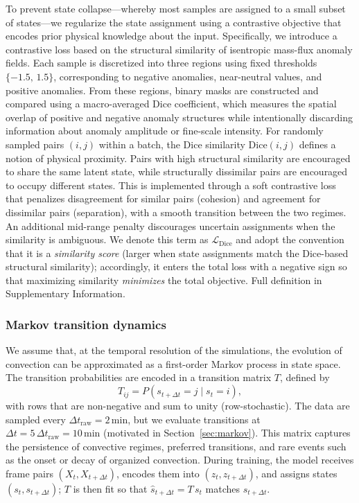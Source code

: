 \documentclass[11pt]{article}
\begin{document}
To prevent state collapse—whereby most samples are assigned to a small subset of states—we regularize the state assignment using a contrastive objective that encodes prior physical knowledge about the input. Specifically, we introduce a contrastive loss based on the structural similarity of isentropic mass-flux anomaly fields. Each sample is discretized into three regions using fixed thresholds $\{-1.5,\,1.5\}$, corresponding to negative anomalies, near-neutral values, and positive anomalies. From these regions, binary masks are constructed and compared using a macro-averaged Dice coefficient, which measures the spatial overlap of positive and negative anomaly structures while intentionally discarding information about anomaly amplitude or fine-scale intensity. For randomly sampled pairs $(i,j)$ within a batch, the Dice similarity $\mathrm{Dice}(i,j)$ defines a notion of physical proximity. Pairs with high structural similarity are encouraged to share the same latent state, while structurally dissimilar pairs are encouraged to occupy different states. This is implemented through a soft contrastive loss that penalizes disagreement for similar pairs (cohesion) and agreement for dissimilar pairs (separation), with a smooth transition between the two regimes. An additional mid-range penalty discourages uncertain assignments when the similarity is ambiguous. We denote this term as $\mathcal{L}_{\mathrm{Dice}}$ and adopt the convention that it is a \emph{similarity score} (larger when state assignments match the Dice-based structural similarity); accordingly, it enters the total loss with a negative sign so that maximizing similarity \emph{minimizes} the total objective. Full definition in Supplementary Information.

\subsubsection{Markov transition dynamics}

We assume that, at the temporal resolution of the simulations, the evolution of convection can be approximated as a first-order Markov process in state space. The transition probabilities are encoded in a transition matrix $T$, defined by
\[
T_{ij} = P(s_{t+\Delta t} = j \mid s_t = i),
\]
with rows that are non-negative and sum to unity (row-stochastic). The data are sampled every $\Delta t_\text{raw}=2\,\mathrm{min}$, but we evaluate transitions at $\Delta t = 5\,\Delta t_\text{raw} = 10\,\mathrm{min}$ (motivated in Section~\ref{sec:markov}). This matrix captures the persistence of convective regimes, preferred transitions, and rare events such as the onset or decay of organized convection. During training, the model receives frame pairs $(X_t, X_{t+\Delta t})$, encodes them into $(z_t, z_{t+\Delta t})$, and assigns states $(s_t, s_{t+\Delta t})$; $T$ is then fit so that $\hat{s}_{t+\Delta t} = T\, s_t$ matches $s_{t+\Delta t}$.
\end{document}
